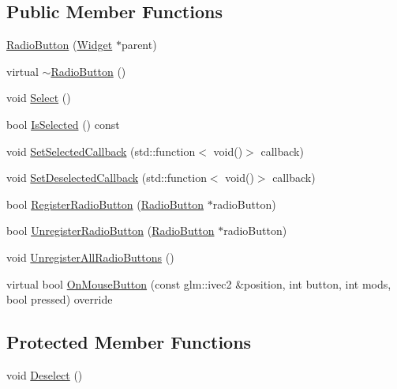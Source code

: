 \subsection*{Public Member Functions}
\begin{DoxyCompactItemize}
\item 
\mbox{\hyperlink{classec__gui_1_1_radio_button_a47767d326d721a4f754926f0a3ef5033}{Radio\+Button}} (\mbox{\hyperlink{classec__gui_1_1_widget}{Widget}} $\ast$parent)
\item 
virtual \mbox{\hyperlink{classec__gui_1_1_radio_button_afad4c8b1b6915e612f514b0710b1bcf0}{$\sim$\+Radio\+Button}} ()
\item 
void \mbox{\hyperlink{classec__gui_1_1_radio_button_a72e6c296c4b8c2f43a6ea863394d0759}{Select}} ()
\item 
bool \mbox{\hyperlink{classec__gui_1_1_radio_button_a6c22c63444d84d52678fcd05d9bd6822}{Is\+Selected}} () const
\item 
void \mbox{\hyperlink{classec__gui_1_1_radio_button_a1277e3e9140a1260f4a4bab7866268cc}{Set\+Selected\+Callback}} (std\+::function$<$ void()$>$ callback)
\item 
void \mbox{\hyperlink{classec__gui_1_1_radio_button_a162efb732e91b51feae948bec72fe382}{Set\+Deselected\+Callback}} (std\+::function$<$ void()$>$ callback)
\item 
bool \mbox{\hyperlink{classec__gui_1_1_radio_button_a5d954dd35f9e9cbbc50f856dec6aea46}{Register\+Radio\+Button}} (\mbox{\hyperlink{classec__gui_1_1_radio_button}{Radio\+Button}} $\ast$radio\+Button)
\item 
bool \mbox{\hyperlink{classec__gui_1_1_radio_button_a9e08d43c8fc3a4e6300489fac5fb2d78}{Unregister\+Radio\+Button}} (\mbox{\hyperlink{classec__gui_1_1_radio_button}{Radio\+Button}} $\ast$radio\+Button)
\item 
void \mbox{\hyperlink{classec__gui_1_1_radio_button_a3935dba5a87855294ba0d5d79f24edb7}{Unregister\+All\+Radio\+Buttons}} ()
\item 
virtual bool \mbox{\hyperlink{classec__gui_1_1_radio_button_a40837f7fe8a630e42a2c8778689f2463}{On\+Mouse\+Button}} (const glm\+::ivec2 \&position, int button, int mods, bool pressed) override
\end{DoxyCompactItemize}
\subsection*{Protected Member Functions}
\begin{DoxyCompactItemize}
\item 
void \mbox{\hyperlink{classec__gui_1_1_radio_button_a3294984201b18a7ad86620d18942b76f}{Deselect}} ()
\end{DoxyCompactItemize}

